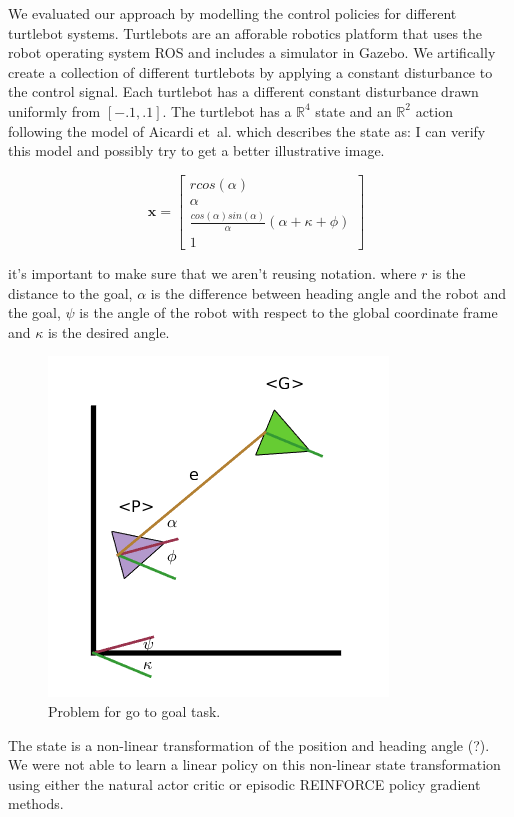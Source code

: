 \documentclass{aamas2016}
\newcommand{\etal}{et~al.\xspace}
\begin{document}
We evaluated our approach by modelling the control policies for different turtlebot systems. Turtlebots are an afforable robotics 
platform that uses the robot operating system ROS and includes a simulator in Gazebo. We artifically create a collection of different 
turtlebots by applying a constant disturbance to the control signal. Each turtlebot has a different constant disturbance drawn 
uniformly from $[-.1, .1]$. The turtlebot has a $\mathbb{R}^4$ state and an $\mathbb{R}^2$ action following the model of 
Aicardi \etal \cite{aicardi1994closed} which describes the state as: {\color{red} I can verify this model and possibly try to get a better 
illustrative image.}

\begin{equation} \label{eqn:state}
	\bm{x} \!=\! \begin{bmatrix} r cos(\alpha) \\ \alpha \\ \frac{cos(\alpha)sin(\alpha)}{\alpha}\left(\alpha + \kappa + \phi \right) \\ 1 \end{bmatrix} \enspace
\end{equation}

{\color{red} it's important to make sure that we aren't reusing notation.}
where $r$ is the distance to the goal, $\alpha$ is the difference between heading angle and the robot and the goal, $\psi$ is the angle of the robot with respect to the global coordinate frame and $\kappa$ is the desired angle. 

\begin{figure}[!htbp]
    \centering
        \includegraphics[width=.3\textwidth]{images/model.png}
        \caption{Problem for go to goal task. }\label{fig:numfeat}
\end{figure}

The state is a non-linear transformation of the position and heading angle (?). We were not able to learn a linear policy on this non-linear state transformation using either the natural actor critic \cite{peters2008natural} or episodic REINFORCE \cite{williams1992simple} policy gradient methods.   
\end{document}
